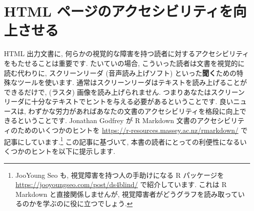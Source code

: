 \documentclass[
  11pt,
  lualatex,ja=standard,jafont=noto]{bxjsreport}
\begin{document}
\hypertarget{html-accessibility}{%
\section{HTML ページのアクセシビリティを向上させる}\label{html-accessibility}}

HTML 出力文書に, 何らかの視覚的な障害を持つ読者に対するアクセシビリティをもたせることは重要です. たいていの場合, こういった読者は文書を視覚的に読む代わりに, スクリーンリーダ (音声読み上げソフト) といった\textbf{聞く}ための特殊なツールを使います. 通常はスクリーンリーダはテキストを読み上げることができるだけで, (ラスタ) 画像を読み上げられません. つまりあなたはスクリーンリーダに十分なテキストでヒントを与える必要があるということです. 良いニュースは, わずかな労力があればあなたの文書のアクセシビリティを格段に向上できるということです. Jonathan Godfrey が R Markdown 文書のアクセシビリティのためのいくつかのヒントを \url{https://r-resources.massey.ac.nz/rmarkdown/} で記事にしています.\footnote{JooYoung Seo も, 視覚障害を持つ人の手助けになる R パッケージを \url{https://jooyoungseo.com/post/ds4blind/} で紹介しています. これは R Markdown と直接関係しませんが, 視覚障害者がどうグラフを読み取っているのかを学ぶのに役に立つでしょう.} この記事に基づいて, 本書の読者にとっての利便性になるいくつかのヒントを以下に提示します.
\end{document}
